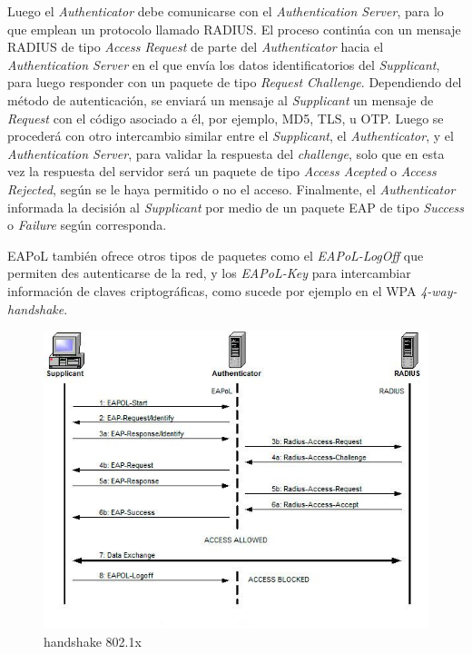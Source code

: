 \documentclass[10pt,a4paper]{article}
\begin{document}
Luego el \textit{Authenticator} debe comunicarse con el \textit{Authentication Server}, para lo que emplean un protocolo llamado RADIUS. El proceso continúa con un mensaje RADIUS de tipo \textit{Access Request} de parte del \textit{Authenticator} hacia el \textit{Authentication Server} en el que envía los datos identificatorios del \textit{Supplicant}, para luego responder con un paquete de tipo \textit{Request Challenge}. Dependiendo del método de autenticación, se enviará un mensaje al \textit{Supplicant} un mensaje de \textit{Request} con el código asociado a él, por ejemplo, MD5, TLS, u OTP. Luego se procederá con otro intercambio similar entre el \textit{Supplicant}, el \textit{Authenticator}, y el \textit{Authentication Server}, para validar la respuesta del \textit{challenge}, solo que en esta vez la respuesta del servidor será un paquete de tipo \textit{Access Acepted} o \textit{Access Rejected}, según se le haya permitido o no el acceso. Finalmente, el \textit{Authenticator} informada la decisión al \textit{Supplicant} por medio de un paquete EAP de tipo \textit{Success} o \textit{Failure} según corresponda.

EAPoL también ofrece otros tipos de paquetes como el \textit{EAPoL-LogOff} que permiten des autenticarse de la red, y los \textit{EAPoL-Key} para intercambiar información de claves criptográficas, como sucede por ejemplo en el WPA \textit{4-way-handshake}.

\begin{figure}[H]
\centerline{\includegraphics[scale=0.7]{images/8021x_handshake.jpg}}
\caption{handshake 802.1x}
\end{figure}
\end{document}
